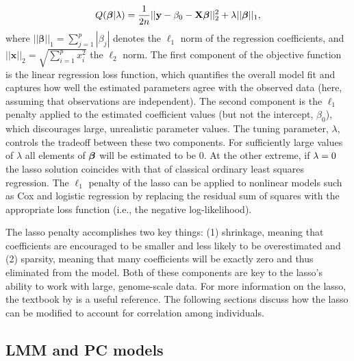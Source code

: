 \begin{equation}
    Q(\boldsymbol{\beta}{} | \lambda) = \frac{1}{2n}|| \mathbf{y} -  \beta_0 - \mathbf{X} \boldsymbol{\beta}{} ||_2^2 + \lambda ||\boldsymbol{\beta}{}||_1,
\end{equation}
where $|| \boldsymbol{\beta} ||_1 = \sum_{j=1}^p |\beta_j|$ denotes the $\ell_1$ norm of the regression coefficients, and $||\mathbf{x}||_2 = \sqrt{\sum_{i=1}^p x_i^2}$ the $\ell_2$ norm. The first component of the objective function is the linear regression loss function, which quantifies the overall model fit and captures how well the estimated parameters agree with the observed data (here, assuming that observations are independent). The second component is the $\ell_1$ penalty applied to the estimated coefficient values (but not the intercept, $\beta_0$), which discourages large, unrealistic parameter values. The tuning parameter, $\lambda$, controls the tradeoff between these two components. For sufficiently large values of $\lambda$ all elements of $\boldsymbol{\beta}{}$ will be estimated to be 0. At the other extreme, if $\lambda = 0$ the lasso solution coincides with that of classical ordinary least squares regression. The $\ell_1$ penalty of the lasso can be applied to nonlinear models such as Cox and logistic regression \citep{tibshirani1997lasso, shevade2003simple} by replacing the residual sum of squares with the appropriate loss function (i.e., the negative log-likelihood).

The lasso penalty accomplishes two key things: (1) shrinkage, meaning that coefficients are encouraged to be smaller and less likely to be overestimated and (2) sparsity, meaning that many coefficients will be exactly zero and thus eliminated from the model. Both of these components are key to the lasso's ability to work with large, genome-scale data.  For more information on the lasso, the textbook by \citet{Hastie2009} is a useful reference.  The following sections discuss how the lasso can be modified to account for correlation among individuals.

\subsection{LMM and PC models}
\label{sec:lmm-and-pc}

